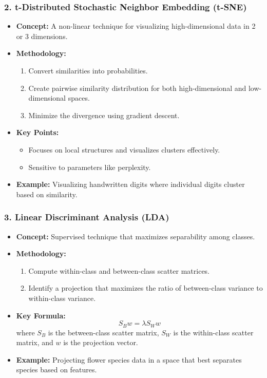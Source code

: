 \documentclass[aspectratio=169]{beamer}
\begin{document}
\begin{frame}[fragile]
    \frametitle{2. t-Distributed Stochastic Neighbor Embedding (t-SNE)}
    \begin{itemize}
        \item \textbf{Concept:} A non-linear technique for visualizing high-dimensional data in 2 or 3 dimensions.
        \item \textbf{Methodology:}
            \begin{enumerate}
                \item Convert similarities into probabilities.
                \item Create pairwise similarity distribution for both high-dimensional and low-dimensional spaces.
                \item Minimize the divergence using gradient descent.
            \end{enumerate}
        \item \textbf{Key Points:}
            \begin{itemize}
                \item Focuses on local structures and visualizes clusters effectively.
                \item Sensitive to parameters like perplexity.
            \end{itemize}
        \item \textbf{Example:} Visualizing handwritten digits where individual digits cluster based on similarity.
    \end{itemize}
\end{frame}

\begin{frame}[fragile]
    \frametitle{3. Linear Discriminant Analysis (LDA)}
    \begin{itemize}
        \item \textbf{Concept:} Supervised technique that maximizes separability among classes.
        \item \textbf{Methodology:}
            \begin{enumerate}
                \item Compute within-class and between-class scatter matrices.
                \item Identify a projection that maximizes the ratio of between-class variance to within-class variance.
            \end{enumerate}
        \item \textbf{Key Formula:}
        \begin{equation}
            S_B w = \lambda S_W w
        \end{equation}
        where \(S_B\) is the between-class scatter matrix, \(S_W\) is the within-class scatter matrix, and \(w\) is the projection vector.
        \item \textbf{Example:} Projecting flower species data in a space that best separates species based on features.
    \end{itemize}
\end{frame}
\end{document}
